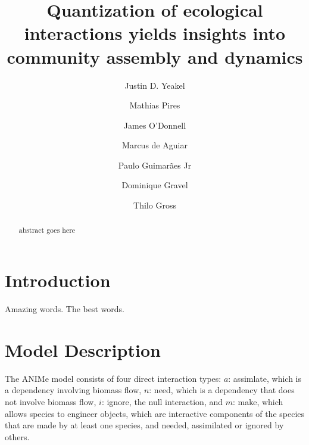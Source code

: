 \documentclass[twocolumn,preprintnumbers,amsmath,amssymb,superscriptaddress]{revtex4}
\begin{document}
\author{Justin D. Yeakel} 

\author{Mathias Pires} \affiliation{}

\author{James O'Donnell} \affiliation{}

\author{Marcus de Aguiar} \affiliation{}

\author{Paulo Guimar\~aes Jr} \affiliation{}

\author{Dominique Gravel} \affiliation{}

\author{Thilo Gross} \affiliation{}

\title{Quantization of ecological interactions yields insights into community assembly and dynamics}


\begin{abstract}
abstract goes here
\end{abstract}

\maketitle

\section*{Introduction}

Amazing words. The best words.



\section*{Model Description}


The ANIMe model consists of four direct interaction types:
$a$: assimlate, which is a dependency involving biomass flow,
$n$: need, which is a dependency that does not involve biomass flow,
$i$: ignore, the null interaction, and
$m$: make, which allows species to engineer objects, which are interactive components of the species that are made by at least one species, and needed, assimilated or ignored by others.
\end{document}
